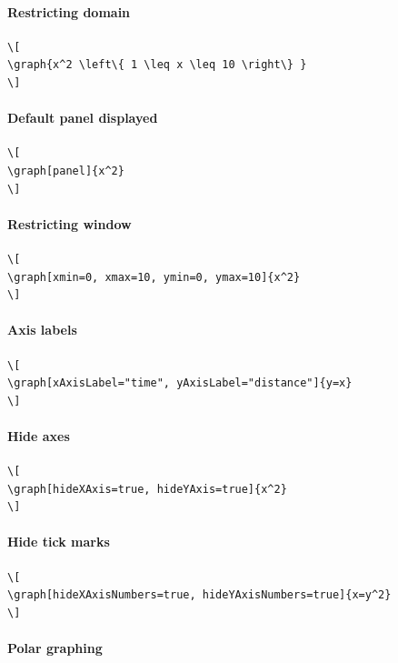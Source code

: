 \documentclass{ximera}
\begin{document}
\paragraph{Restricting domain}


\begin{verbatim}
\[
\graph{x^2 \left\{ 1 \leq x \leq 10 \right\} }
\]
\end{verbatim}
\paragraph{Default panel displayed}

  
\begin{verbatim}
\[
\graph[panel]{x^2}
\]
\end{verbatim}
\paragraph{Restricting window}

  
\begin{verbatim}
\[
\graph[xmin=0, xmax=10, ymin=0, ymax=10]{x^2}
\]
\end{verbatim}
\paragraph{Axis labels}

  
\begin{verbatim}
\[
\graph[xAxisLabel="time", yAxisLabel="distance"]{y=x}
\]
\end{verbatim}
\paragraph{Hide axes}

  
\begin{verbatim}
\[
\graph[hideXAxis=true, hideYAxis=true]{x^2}
\]
\end{verbatim}
\paragraph{Hide tick marks}

  
\begin{verbatim}
\[
\graph[hideXAxisNumbers=true, hideYAxisNumbers=true]{x=y^2}
\]
\end{verbatim}
\paragraph{Polar graphing}
\end{document}
